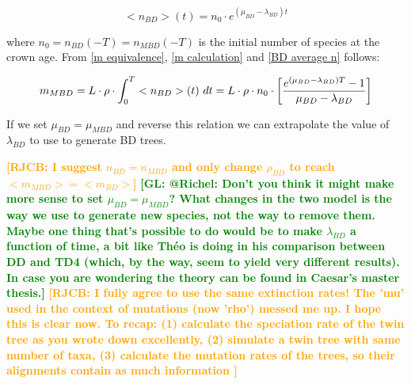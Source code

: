 \documentclass{article}
\newcommand*\richel[1]{\textcolor{orange}{\textbf{[RJCB: #1]}}}
\newcommand*\gio[1]{\textcolor{green}{\textbf{[GL: #1]}}}
\begin{document}
\begin{itemize}
\begin{equation}
    <n_{BD}>(t) = n_{0} \cdot e^{(\mu_{BD} - \lambda_{BD})t} \label{BD average n}
\end{equation}

where $n_{0} = n_{BD}(-T) = n_{MBD}(-T)$ is the initial number of species at the crown age.
From \ref{m equivalence}, \ref{m calculation} and \ref{BD average n} follows:

\begin{equation}
m_{MBD} = L \cdot \rho \cdot \int_{0}^{T} <n_{BD}>(t)\ dt \\
= L \cdot \rho \cdot n_{0} \cdot \left[ \frac{e^{(\mu_{BD} - \lambda_{BD})T} - 1}{\mu_{BD} - \lambda_{BD}} \right]
\end{equation}

If we set $\mu_{BD} = \mu_{MBD}$ and reverse this relation we can extrapolate the value of $\lambda_{BD}$ to use to generate BD trees.

\richel{I suggest $n_{BD} = n_{MBD}$ and only 
change $\rho_{BD}$ to reach $<m_{MBD}> = <m_{BD}>$}
\gio{@Richel: Don't you think it might make more sense to set $\mu_{BD} = \mu_{MBD}$? What changes in the two model is the way we use to generate new species, not the way to remove them. Maybe one thing that's possible to do would be to make $\lambda_{BD}$ a function of time, a bit like Théo is doing in his comparison between DD and TD4 (which, by the way, seem to yield very different results). In case you are wondering the theory can be found in Caesar's master thesis.}
\richel{
  I fully agree to use the same extinction rates!
  The 'mu' used in the context of mutations (now 'rho') messed me up.
  I hope this is clear now. To recap: 
  (1) calculate the speciation rate of the twin tree as you wrote down excellently,
  (2) simulate a twin tree with same number of taxa,
  (3) calculate the mutation rates of the trees, 
    so their alignments contain as much information
}


\end{itemize}
\end{document}
